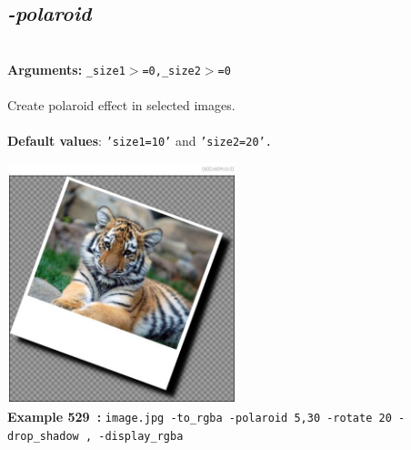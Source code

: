 \documentclass[a4paper,11pt,twoside]{book}
\begin{document}
\subsection{\emph{-polaroid} }\vspace*{-0.5em}
~\\\textbf{Arguments: } 
{\small \texttt{\_size1$>$=0,\_size2$>$=0}}\\~\\
Create polaroid effect in selected images.
~\\~\\\textbf{Default values}: {\small \texttt{'size1=10'} and \texttt{'size2=20'.}}
\begin{center}\includegraphics[keepaspectratio=true,height=7cm,width=\textwidth]{img/gmic_def529.jpg}\\
{\footnotesize \textbf{Example 529~:} \texttt{image.jpg -to\_rgba -polaroid 5,30 -rotate 20 -drop\_shadow , -display\_rgba}}
\end{center}
\end{document}
